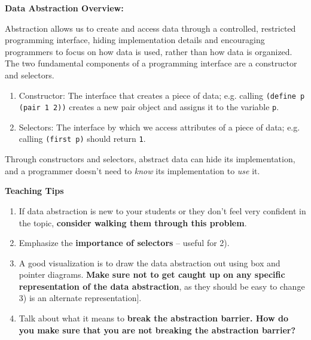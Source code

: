 \textbf{Data Abstraction Overview:}

Abstraction allows us to create and access data through a controlled, restricted programming interface, hiding implementation details and encouraging programmers to focus on how data is used, rather than how data is organized. The two fundamental components of a programming interface are a constructor and selectors.
\begin{enumerate}
	\item Constructor: The interface that creates a piece of data; e.g. calling \texttt{(define p (pair 1 2))} creates a new pair object and assigns it to the variable \texttt{p}.
	\item Selectors: The interface by which we access attributes of a piece of data; e.g. calling \lstinline{(first p)} should return \lstinline{1}.
\end{enumerate}

Through constructors and selectors, abstract data can hide its implementation, and a programmer doesn’t need to {\it know} its implementation to {\it use} it.

\begin{blocksection}
	\begin{guide}
	\textbf{Teaching Tips}
	\begin{enumerate}
		\item If data abstraction is new to your students or they don't feel very confident in the topic, \textbf{consider walking them through this problem}.
        \item Emphasize the \textbf{importance of selectors} -- useful for 2).
        \item A good visualization is to draw the data abstraction out using box and pointer diagrams. \textbf{Make sure not to get caught up on any specific representation of the data abstraction}, as they should be easy to change 3) is an alternate representation].
        \item Talk about what it means to \textbf{break the abstraction barrier. How do you make sure that you are not breaking the abstraction barrier?}
	\end{enumerate}
	\end{guide}
\end{blocksection}